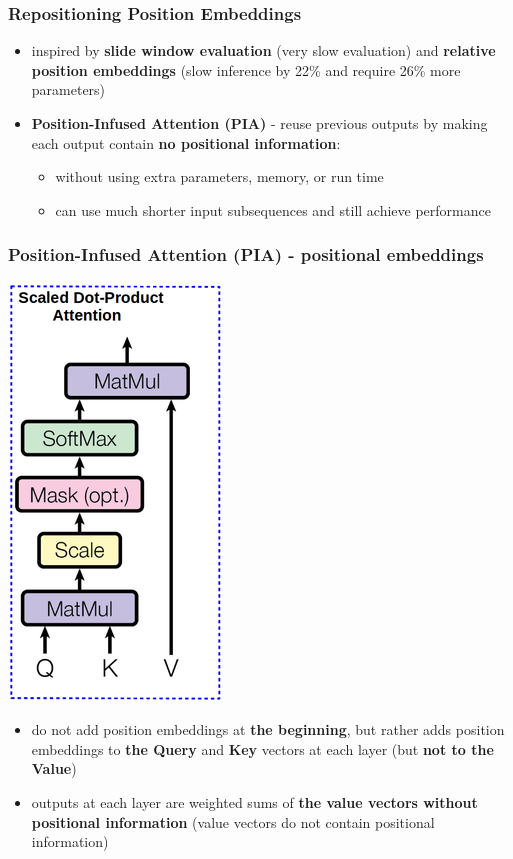 \documentclass{beamer}
\begin{document}
\begin{frame}
    \frametitle{Repositioning Position Embeddings}
    \begin{itemize}
        \item inspired by \textbf{slide window evaluation} (very slow evaluation) and \textbf{relative position embeddings} (slow inference by 22\% and require 26\% more parameters)
        \item \textbf{Position-Infused Attention (PIA)} - reuse previous outputs by making each output contain \textbf{no positional information}:
        \begin{itemize}
           \item without using extra parameters, memory, or run time
           \item can use much shorter input subsequences and still achieve performance
        \end{itemize}
    \end{itemize}
\end{frame}

\begin{frame}
    \frametitle{Position-Infused Attention (PIA) - positional embeddings}
    \begin{center}
        \includegraphics[scale=0.30]{img/attention.png}
        \begin{itemize}
            \item do not add position embeddings at \textbf{the beginning}, but rather adds position embeddings to \textbf{the Query} and \textbf{Key} vectors at each layer (but \textbf{not to the Value})
            \item outputs at each layer are weighted sums of \textbf{the value vectors without positional information} (value vectors do not contain positional information)
        \end{itemize}
    \end{center}
\end{frame}
\end{document}
